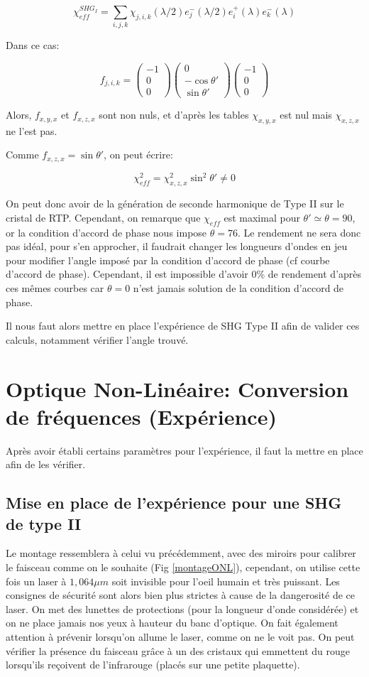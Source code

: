 \documentclass[a4paper,11pt]{report}
\begin{document}
\[\chi_{eff}^{SHG_I}=\sum_{i,j,k}\chi_{j,i,k}(\lambda/2)e^-_j(\lambda/2)e^+_i(\lambda)e^-_k(\lambda)\]

Dans ce cas:

\[f_{j,i,k}=\begin{pmatrix}-1\\0\\0\end{pmatrix}\begin{pmatrix}0\\-\cos\theta'\\\sin\theta'\end{pmatrix}\begin{pmatrix}-1\\0\\0\end{pmatrix}\]

Alors, $f_{x,y,x}$ et $f_{x,z,x}$ sont non nuls, et d'après les tables $\chi_{x,y,x}$ est nul mais $\chi_{x,z,x}$ ne l'est pas. 

Comme $f_{x,z,x}=\sin\theta'$, on peut écrire:

\[\chi_{eff}^2=\chi_{x,z,x}^2\sin^2\theta'\neq 0\]

On peut donc avoir de la génération de seconde harmonique de Type II sur le cristal de RTP. Cependant, on remarque que $\chi_{eff}$ est maximal pour $\theta'\simeq\theta=90$\textdegree, or la condition d'accord de phase nous impose $\theta=76$\textdegree. Le rendement ne sera donc pas idéal, pour s'en approcher, il faudrait changer les longueurs d'ondes en jeu pour modifier l'angle imposé par la condition d'accord de phase (cf courbe d'accord de phase). Cependant, il est impossible d'avoir 0\% de rendement d'après ces mêmes courbes car $\theta=0$ n'est jamais solution de la condition d'accord de phase.

Il nous faut alors mettre en place l'expérience de SHG Type II afin de valider ces calculs, notamment vérifier l'angle trouvé.

\chapter{Optique Non-Linéaire: Conversion de fréquences (Expérience)} \label{ONLExp}
Après avoir établi certains paramètres pour l'expérience, il faut la mettre en place afin de les vérifier.
\section{Mise en place de l'expérience pour une SHG de type II}
Le montage ressemblera à celui vu précédemment, avec des miroirs pour calibrer le faisceau comme on le souhaite (Fig \ref{montageONL}), cependant, on utilise cette fois un laser à $1,064\mu m$ soit invisible pour l'oeil humain et très puissant. Les consignes de sécurité sont alors bien plus strictes à cause de la dangerosité de ce laser. On met des lunettes de protections (pour la longueur d'onde considérée) et on ne place jamais nos yeux à hauteur du banc d'optique. On fait également attention à prévenir lorsqu'on allume le laser, comme on ne le voit pas. On peut vérifier la présence du faisceau grâce à un des cristaux qui emmettent du rouge lorsqu'ils reçoivent de l'infrarouge (placés sur une petite plaquette).
\end{document}
